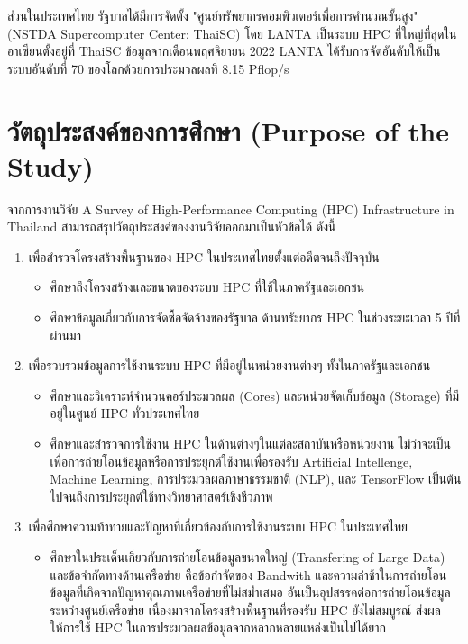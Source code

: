 \documentclass[a4paper,12pt]{extarticle}
\begin{document}
ส่วนในประเทศไทย รัฐบาลได้มีการจัดตั้ง "ศูนย์ทรัพยากรคอมพิวเตอร์เพื่อการคำนวณขั้นสูง" (NSTDA Supercomputer Center: ThaiSC) โดย LANTA เป็นระบบ HPC ที่ใหญ่ที่สุดในอาเซียนตั้งอยู่ที่ ThaiSC ข้อมูลจากเดือนพฤศจิยายน 2022 LANTA ได้รับการจัดอันดับให้เป็นระบบอันดับที่ 70 ของโลกด้วยการประมวลผลที่ 8.15 Pflop/s

\newpage

\section{วัตถุประสงค์ของการศึกษา (Purpose of the Study)}

จากการงานวิจัย A Survey of High-Performance Computing (HPC) Infrastructure in Thailand สามารถสรุปวัตถุประสงค์ของงานวิจัยออกมาเป็นหัวข้อได้ ดังนี้
\begin{enumerate}
    \item เพื่อสำรวจโครงสร้างพื้นฐานของ HPC ในประเทศไทยตั้งแต่อดีตจนถึงปัจจุบัน
    \begin{itemize}
		\item ศึกษาถึงโครงสร้างและขนาดของระบบ HPC ที่ใช้ในภาครัฐและเอกชน
		\item ศึกษาข้อมูลเกี่ยวกับการจัดซื้อจัดจ้างของรัฐบาล ด้านทรัะยากร HPC ในช่วงระยะเวลา 5 ปีที่ผ่านมา
	\end{itemize}
    \item เพื่อรวบรวมข้อมูลการใช้งานระบบ HPC ที่มีอยู่ในหน่วยงานต่างๆ ทั้งในภาครัฐและเอกชน
    \begin{itemize}
		\item ศึกษาและวิเคราะห์จำนวนคอร์ประมวลผล (Cores) และหน่วยจัดเก็บข้อมูล (Storage) ที่มีอยู่ในศูนย์ HPC ทั่วประเทศไทย
		\item ศึกษาและสำรวจการใช้งาน HPC ในด้านต่างๆในแต่ละสถาบันหรือหน่วยงาน ไม่ว่าจะเป็นเพื่อการถ่ายโอนข้อมูลหรือการประยุกต์ใช้งานเพื่อรองรับ Artificial Intellenge, Machine Learning, การประมวลผลภาษาธรรมชาติ (NLP), และ TensorFlow เป็นต้น ไปจนถึงการประยุกต์ใช้ทางวิทยาศาสตร์เชิงชีวภาพ
	\end{itemize}
    \item เพื่อศึกษาความท้าทายและปัญหาที่เกี่ยวข้องกับการใช้งานระบบ HPC ในประเทศไทย
    \begin{itemize}
		\item ศึกษาในประเด็นเกี่ยวกับการถ่ายโอนข้อมูลขนาดใหญ่ (Transfering of Large Data) และข้อจำกัดทางด้านเครือข่าย คือข้อกำจัดของ Bandwith และความล่าช้าในการถ่ายโอนข้อมูลที่เกิดจากปัญหาคุณภาพเครือข่ายที่ไม่สม่ำเสมอ อันเป็นอุปสรรคต่อการถ่ายโอนข้อมูลระหว่างศูนย์เครือข่าย เนื่องมาจากโครงสร้างพื้นฐานที่รองรับ HPC ยังไม่สมบูรณ์ ส่งผลให้การใช้ HPC ในการประมวลผลข้อมูลจากหลากหลายแหล่งเป็นไปได้ยาก

\end{itemize}
\end{enumerate}
\end{document}
